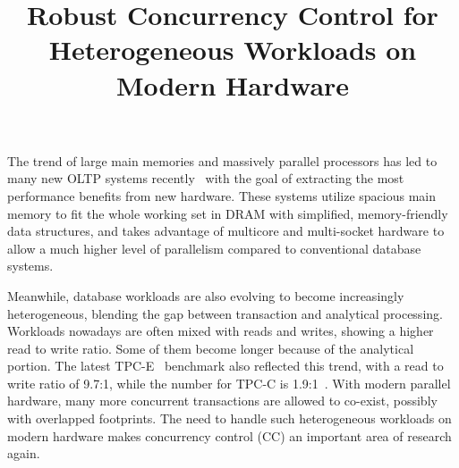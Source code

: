 \documentclass[preprint]{sig-alternate-nocprt}
\begin{document}

\title{Robust Concurrency Control for Heterogeneous Workloads on Modern Hardware}

\author{
\alignauthor
}

\maketitle

The trend of large main memories and massively parallel processors has led to many new OLTP systems recently~\cite{HStore,Hyper,Hekaton,Silo} with the goal of extracting the most performance benefits from new hardware. These systems utilize spacious main memory to fit the whole working set in DRAM with simplified, memory-friendly data structures, and takes advantage of multicore and multi-socket hardware to allow a much higher level of parallelism compared to conventional database systems.

Meanwhile, database workloads are also evolving to become increasingly heterogeneous, blending the gap between transaction and analytical processing. Workloads nowadays are often mixed with reads and writes, showing a higher read to write ratio. Some of them become longer because of the analytical portion. The latest TPC-E~\cite{TPC-E} benchmark also reflected this trend, with a read to write ratio of 9.7:1, while the number for TPC-C is 1.9:1~\cite{TPC-Compare}. With modern parallel hardware, many more concurrent transactions are allowed to co-exist, possibly with overlapped footprints. The need to handle such heterogeneous workloads on modern hardware makes concurrency control (CC) an important area of research again.
\end{document}
